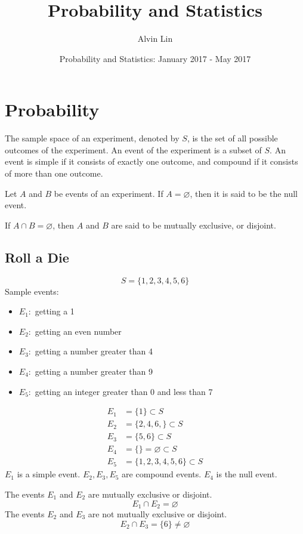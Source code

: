 \documentclass[letterpaper, 12pt]{math}
\title{Probability and Statistics}
\author{Alvin Lin}
\date{Probability and Statistics: January 2017 - May 2017}
\begin{document}
\maketitle

\section*{Probability}
The sample space of an experiment, denoted by \( S \), is the set of all
possible outcomes of the experiment. An event of the experiment is a subset
of \( S \). An event is simple if it consists of exactly one outcome, and
compound if it consists of more than one outcome. \par
Let \( A \) and \( B \) be events of an experiment. If \( A = \varnothing \),
then it is said to be the null event. \par
If \( A \cap B = \varnothing \), then \( A \) and \( B \) are said to be mutually
exclusive, or disjoint.

\subsection*{Roll a Die}
\[ S = \big\{ 1, 2, 3, 4, 5, 6 \big\} \]
Sample events:
\begin{itemize}
  \item \( E_{1}: \) getting a 1
  \item \( E_{2}: \) getting an even number
  \item \( E_{3}: \) getting a number greater than 4
  \item \( E_{4}: \) getting a number greater than 9
  \item \( E_{5}: \) getting an integer greater than 0 and less than 7
\end{itemize}
\begin{align*}
  E_{1} &= \big\{ 1 \big\} \subset S \\
  E_{2} &= \big\{ 2, 4, 6, \big\} \subset S \\
  E_{3} &= \big\{ 5, 6 \big\} \subset S \\
  E_{4} &= \big\{ \big\} = \varnothing \subset S \\
  E_{5} &= \big\{ 1, 2, 3, 4, 5, 6 \big\} \subset S
\end{align*}
\( E_{1} \) is a simple event. \( E_{2}, E_{3}, E_{5} \) are compound events.
\( E_{4} \) is the null event. \par
The events \( E_{1} \) and \( E_{2} \) are mutually exclusive or disjoint.
\[ E_{1} \cap E_{2} = \varnothing \]
The events \( E_{2} \) and \( E_{3} \) are not mutually exclusive or disjoint.
\[ E_{2} \cap E_{3} = \big\{ 6 \big\} \neq \varnothing \]
\end{document}
